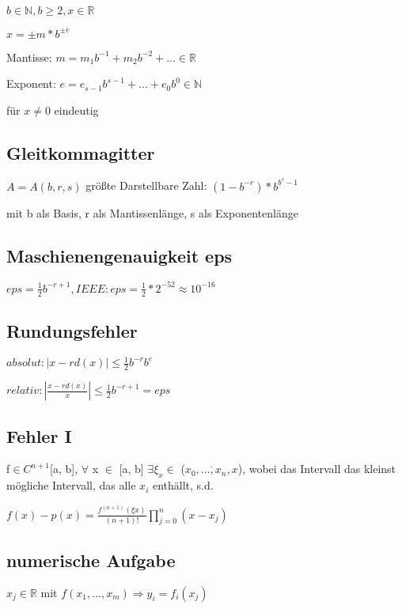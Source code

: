 \documentclass[12pt,a4paper]{article} %
\begin{document}
	$b \in \mathbb{N}, b \ge 2, x \in \mathbb{R}$
	
	$x = \pm m * b^{\pm e}$
	
	Mantisse: $m = m_1b^{-1} + m_2b^{-2} + ... \in \mathbb{R}$
	
	Exponent: $e = e_{s-1}b^{s-1} + ... + e_0b^0 \in \mathbb{N}$
	
	für $x \ne 0$ eindeutig
	
	\subsection{Gleitkommagitter}
	
	$A = A(b, r, s)$ größte Darstellbare Zahl: $(1 - b^{-r})*b^{b^s-1}$
	
	mit b als Basis, r als Mantissenlänge, s als Exponentenlänge
	
	\subsection{Maschienengenauigkeit eps}
	
	$eps = \frac{1}{2}b^{-r + 1}, IEEE: eps = \frac{1}{2} * 2^{-52} \approx 10^{-16}$
	
	\subsection{Rundungsfehler}
	
	$absolut: |x - rd(x)| \le \frac{1}{2}b^{-r}b^e$
	
	$relativ: |\frac{x - rd(x)}{x}| \le \frac{1}{2}b^{-r+1} = eps$
	
	\subsection{Fehler I}
	
	f$ \in C^{n+1}$[a, b], $\forall$ x $\in$ [a, b] $\exists \xi_x \in$ ($\overline{x_0, ..., x_n, x}$), wobei das Intervall das kleinst mögliche Intervall, das alle $x_i$ enthällt, s.d.
	
	$f(x) - p(x) = \frac{f^{(n+1)}(\xi x)}{(n+1)!} \prod\limits_{j = 0}^{n}(x - x_j)$
	
	\subsection{numerische Aufgabe}
	
	$x_j \in \mathbb{R} \text{ mit }f(x_1, ..., x_m) \Rightarrow y_i = f_i(x_j)$
	
\end{document}
